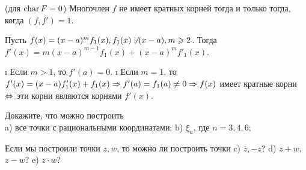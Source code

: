 \begin{problem}[37 (9.2)]
(для $\operatorname{char} F = 0$) Многочлен $f$ не имеет кратных корней тогда и только тогда, когда $(f,f')=1$.
\end{problem}

\begin{solution}
Пусть \(f(x) = (x-a)^mf_1(x), f_1(x) \not\Divby (x-a), m \ge 2\). Тогда \(f'(x)=m(x-a)^{m-1}f_1(x)+(x-a)^mf'_1(x)\).

\begin{itemize}
\tightlist
\i
  Если \(m>1\), то \(f'(a) = 0\).
\i
  Если \(m=1\), то \(f'(x)=(x-a)f'_1(x)+f_1(x) \Rightarrow f'(a)=f_1(a) \ne 0 \Rightarrow f(x)\) имеет кратные корни \(\Leftrightarrow\) эти корни являются корнями \(f'(x)\).
\end{itemize}

\end{solution}

\begin{problem}[38(9.6)]
Докажите, что можно построить\\ 
a) все точки с рациональными координатами;
b) $\xi_n$, где $n=3,4,6$;

Если мы построили точки $z,w$, то можно ли построить точки 
c) $\overline{z},-z$? 
d) $z+w$, $z-w$?
e) $z\cdot w$?
\end{problem}

